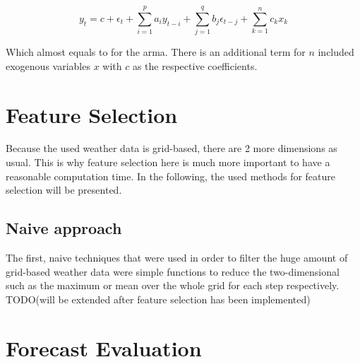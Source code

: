 \begin{equation}
y_t = c+\epsilon_t+\sum_{i=1}^{p}a_iy_{t-i}+\sum_{j=1}^{q}b_j\epsilon_{t-j}+\sum_{k=1}^{n}c_kx_k
\label{eq:armax}
\end{equation}

Which almost equals to  for the \gls{arma}. There is an additional term for $n$ included exogenous variables $x$ with $c$ as the respective coefficients.

%

\section{Feature Selection}
\label{sec:featsel}

Because the used weather data is grid-based, there are 2 more dimensions as usual. This is why feature selection here is much more important to have a reasonable computation time. In the following, the used methods for feature selection will be presented.\\

\subsection{Naive approach}

The first, naive techniques that were used in order to filter the huge amount of grid-based weather data were simple functions to reduce the two-dimensional such as the maximum or mean over the whole grid for each step respectively.\\

TODO(will be extended after feature selection has been implemented)\\


\section{Forecast Evaluation}
\label{sec:fceval}

